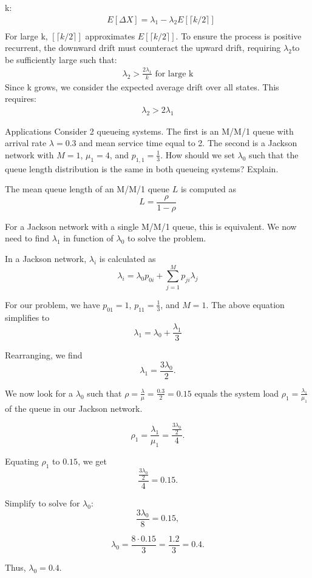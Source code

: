 \begin{solution}
    k:
    \begin{align*}
        &E[\Delta X]=\lambda_1-\lambda_2 E[\lceil k/2 \rceil]\\
    \end{align*}
    For large k, $[\lceil k/2 \rceil]$ approximates $E[\lceil k/2 \rceil]$.
    To ensure the process is positive recurrent, the downward drift must counteract the upward drift, requiring $\lambda_2$to be sufficiently large such that:
    \begin{align*}
        \lambda_2 > \frac{2\lambda_1}{k} \text{ for large k}
    \end{align*}
    Since k grows, we consider the expected average drift over all states. This requires:
    \begin{align*}
        \lambda_2 > 2\lambda_1
    \end{align*}
\end{solution}

\begin{problem}{Applications}
Consider 2 queueing systems. The first is an M/M/1 queue with arrival rate \( \lambda = 0.3 \) and mean service time equal to 2. The second is a Jackson network with \( M = 1 \), \( \mu_1 = 4 \), and \( p_{1,1} = \frac{1}{3} \). How should we set \( \lambda_0 \) such that the queue length distribution is the same in both queueing systems? Explain.
\end{problem}
\begin{solution}
The mean queue length of an M/M/1 queue \( L \) is computed as
\[
L = \frac{\rho}{1-\rho}
\]

For a Jackson network with a single M/M/1 queue, this is equivalent. We now need to find \( \lambda_1 \) in function of \( \lambda_0 \) to solve the problem.

In a Jackson network, \( \lambda_i \) is calculated as
\[
\lambda_i = \lambda_0 p_{0i} + \sum_{j=1}^M p_{ji} \lambda_j
\]

For our problem, we have \( p_{01} = 1 \), \( p_{11} = \frac{1}{3} \), and \( M = 1 \). The above equation simplifies to
\[
\lambda_1 = \lambda_0 + \frac{\lambda_1}{3}
\]

Rearranging, we find
\[
\lambda_1 = \frac{3\lambda_0}{2}.
\]

We now look for a \( \lambda_0 \) such that \( \rho = \frac{\lambda}{\mu} = \frac{0.3}{2} = 0.15 \) equals the system load \( \rho_1 = \frac{\lambda_1}{\mu_1} \) of the queue in our Jackson network.

\[
\rho_1 = \frac{\lambda_1}{\mu_1} = \frac{\frac{3\lambda_0}{2}}{4}.
\]

Equating \( \rho_1 \) to \( 0.15 \), we get
\[
\frac{\frac{3\lambda_0}{2}}{4} = 0.15.
\]

Simplify to solve for \( \lambda_0 \):
\[
\frac{3\lambda_0}{8} = 0.15,
\]

\[
\lambda_0 = \frac{8 \cdot 0.15}{3} = \frac{1.2}{3} = 0.4.
\]

Thus, \( \lambda_0 = 0.4 \).\end{solution}

